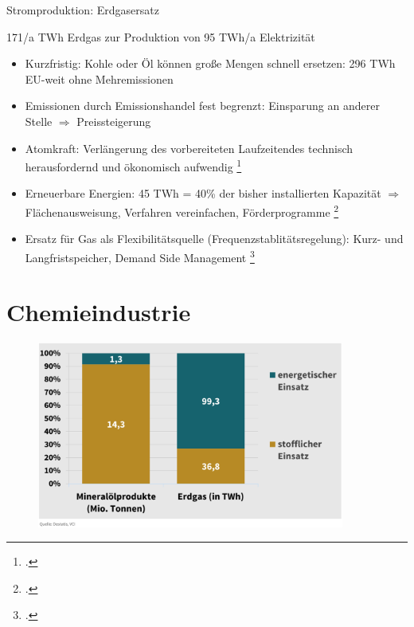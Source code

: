 \documentclass[10pt]{beamer}
\begin{document}
\begin{frame}{Stromproduktion: Erdgasersatz}
  \small{
  171/a TWh Erdgas zur Produktion von 95 TWh/a Elektrizität

  \begin{itemize}
    \item Kurzfristig: Kohle oder Öl können große Mengen schnell ersetzen: 
      296 TWh EU-weit ohne Mehremissionen 
    \item Emissionen durch Emissionshandel fest begrenzt: 
      Einsparung an anderer Stelle $\Rightarrow$ Preissteigerung 
    \item Atomkraft: Verlängerung des vorbereiteten Laufzeitendes 
      technisch herausfordernd und ökonomisch aufwendig \footcite{leo}
    \item Erneuerbare Energien: 
      45 TWh = 40\% der bisher installierten Kapazität 
      $\Rightarrow$ Flächenausweisung, Verfahren vereinfachen, Förderprogramme \footcite{leo}
    \item Ersatz für Gas als Flexibilitätsquelle (Frequenzstablitätsregelung):
      Kurz- und Langfristspeicher, Demand Side Management \footcite{iea2022}
  \end{itemize}
  }
\end{frame}

\section{Chemieindustrie}

\begin{frame}
\begin{figure}
\includegraphics[width=0.9\textwidth]{fig/anteile_chemieindustrie.png}

\scriptsize{}
\end{figure}
\end{frame}
\end{document}
